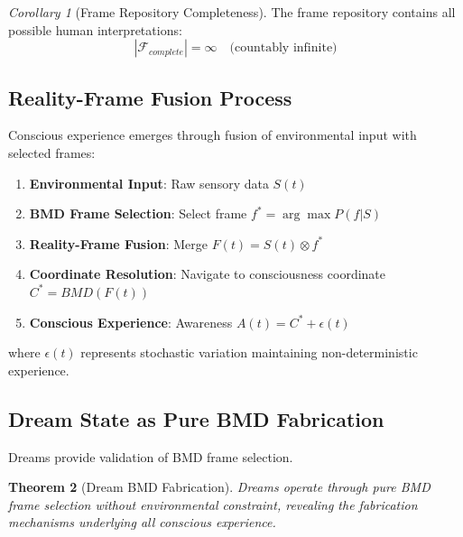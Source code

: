 \documentclass[12pt]{article}
\newtheorem{theorem}{Theorem}[section]
\newtheorem{corollary}[theorem]{Corollary}
\theoremstyle{definition}
\theoremstyle{remark}
\newtheorem{corollary}[theorem]{Corollary}
\begin{document}
\begin{corollary}[Frame Repository Completeness]
The frame repository contains all possible human interpretations:
\begin{equation}
|\mathcal{F}_{complete}| = \infty \quad \text{(countably infinite)}
\end{equation}
\end{corollary}

\subsection{Reality-Frame Fusion Process}

Conscious experience emerges through fusion of environmental input with selected frames:

\begin{enumerate}
\item \textbf{Environmental Input}: Raw sensory data $S(t)$
\item \textbf{BMD Frame Selection}: Select frame $f^* = \arg\max P(f | S)$
\item \textbf{Reality-Frame Fusion}: Merge $F(t) = S(t) \otimes f^*$
\item \textbf{Coordinate Resolution}: Navigate to consciousness coordinate $C^* = BMD(F(t))$
\item \textbf{Conscious Experience}: Awareness $A(t) = C^* + \epsilon(t)$
\end{enumerate}

where $\epsilon(t)$ represents stochastic variation maintaining non-deterministic experience.

\subsection{Dream State as Pure BMD Fabrication}

Dreams provide validation of BMD frame selection.

\begin{theorem}[Dream BMD Fabrication]
\label{thm:dream_fabrication}
Dreams operate through pure BMD frame selection without environmental constraint, revealing the fabrication mechanisms underlying all conscious experience.
\end{theorem}
\end{document}
